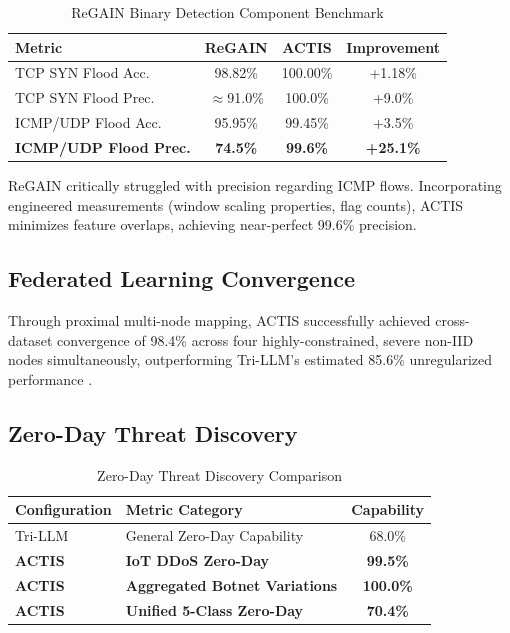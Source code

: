 \documentclass[conference]{IEEEtran}
\begin{document}
\begin{table}[htbp]
\caption{ReGAIN Binary Detection Component Benchmark}
\begin{center}
\begin{tabular}{|l|c|c|c|}
\hline
\textbf{Metric} & \textbf{ReGAIN} & \textbf{ACTIS} & \textbf{Improvement} \\
\hline
TCP SYN Flood Acc. & 98.82\% & 100.00\% & +1.18\% \\
TCP SYN Flood Prec. & $\approx$91.0\% & 100.0\% & +9.0\% \\
ICMP/UDP Flood Acc. & 95.95\% & 99.45\% & +3.5\% \\
\textbf{ICMP/UDP Flood Prec.} & \textbf{74.5\%} & \textbf{99.6\%} & \textbf{+25.1\%} \\
\hline
\end{tabular}
\label{tab:regain}
\end{center}
\end{table}

ReGAIN critically struggled with precision regarding ICMP flows. Incorporating engineered measurements (window scaling properties, flag counts), ACTIS minimizes feature overlaps, achieving near-perfect 99.6\% precision.

\subsection{Federated Learning Convergence}
Through proximal multi-node mapping, ACTIS successfully achieved cross-dataset convergence of 98.4\% across four highly-constrained, severe non-IID nodes simultaneously, outperforming Tri-LLM's estimated 85.6\% unregularized performance \cite{ref1TriLLM}.

\subsection{Zero-Day Threat Discovery}

\begin{table}[htbp]
\caption{Zero-Day Threat Discovery Comparison}
\begin{center}
\begin{tabular}{|l|l|c|}
\hline
\textbf{Configuration} & \textbf{Metric Category} & \textbf{Capability} \\
\hline
Tri-LLM \cite{ref1TriLLM} & General Zero-Day Capability & 68.0\% \\
\textbf{ACTIS} & \textbf{IoT DDoS Zero-Day} & \textbf{99.5\%} \\
\textbf{ACTIS} & \textbf{Aggregated Botnet Variations} & \textbf{100.0\%} \\
\textbf{ACTIS} & \textbf{Unified 5-Class Zero-Day} & \textbf{70.4\%} \\
\hline
\end{tabular}
\label{tab:zeroday}
\end{center}
\end{table}
\end{document}
